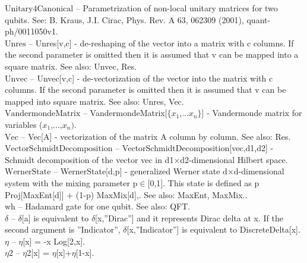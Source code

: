 \documentclass[a4paper,10pt]{scrartcl}
\begin{document}
\textbf{$ \text{Unitary4Canonical} $ }-- Parametrization of non-local unitary matrices for two qubits. See: B. Kraus, J.I. Cirac, Phys. Rev. A 63, 062309 (2001), quant-ph/0011050v1.$  $\\

\textbf{$ \text{Unres} $ }-- Unres[v,c] - de-reshaping of the vector into a matrix with c columns. If the second parameter is omitted then it is assumed that v can be mapped into a square matrix. See also: Unvec, Res.$  $\\

\textbf{$ \text{Unvec} $ }-- Unvec[v,c] - de-vectorization of the vector into the matrix with c columns. If the second parameter is omitted then it is assumed that v can be mapped into square matrix. See also: Unres, Vec.$  $\\

\textbf{$ \text{VandermondeMatrix} $ }-- VandermondeMatrix[$\{$$ x_1\text{,...}x_n $$\}$] - Vandermonde matrix for variables ($ x_1 $,...,$ x_n\text{).} $\\

\textbf{$ \text{Vec} $ }-- Vec[A] - vectorization of the matrix A column by column. See also: Res.$  $\\

\textbf{$ \text{VectorSchmidtDecomposition} $ }-- VectorSchmidtDecomposition[vec,d1,d2] - Schmidt decomposition of the vector vec in d1$\times $d2-dimensional Hilbert space.$  $\\

\textbf{$ \text{WernerState} $ }-- WernerState[d,p] - generalized Werner state d$\times $d-dimensional system with the mixing parameter p$\in $[0,1]. This state is defined as p Proj[MaxEnt[d]] + (1-p) MaxMix[d],. See also: MaxEnt, MaxMix..$  $\\

\textbf{$ \text{wh} $ }-- Hadamard gate for one qubit. See also: QFT.$  $\\

\textbf{$ \delta  $ }-- $\delta $[a] is equivalent to $\delta $[x,''Dirac''] and it represents Dirac delta at x. If the second argument is ''Indicator'', $\delta $[x,''Indicator''] is equivalent to DiscreteDelta[x].$  $\\

\textbf{$ \eta  $ }-- $\eta $[x] = -x Log[2,x].$  $\\

\textbf{$ \text{$\eta $2} $ }-- $\eta $2[x] = $\eta $[x]+$\eta $[1-x].$  $\\
\end{document}
